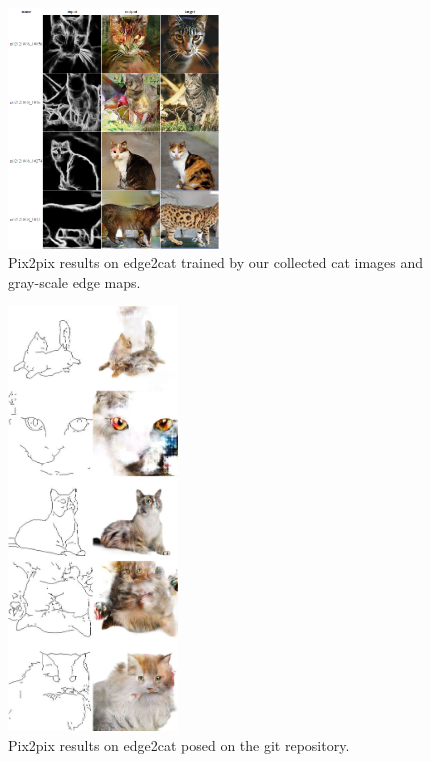 \begin{figure}
	\includegraphics[width=0.5\textwidth]{figures/pix2pix/edge2photo/grayscale/200/results.png}
	\caption{\label{pix2pix_edge2cat_gray_200}Pix2pix results on edge2cat trained by our collected cat images and gray-scale edge maps.}
\end{figure}

\begin{figure}
	\includegraphics[width=0.4\textwidth]{figures/pix2pix/edges2cats-sheet}
	\caption{\label{pix2pix_reported_edge2cat}Pix2pix results on edge2cat posed on the git repository.}
\end{figure}

